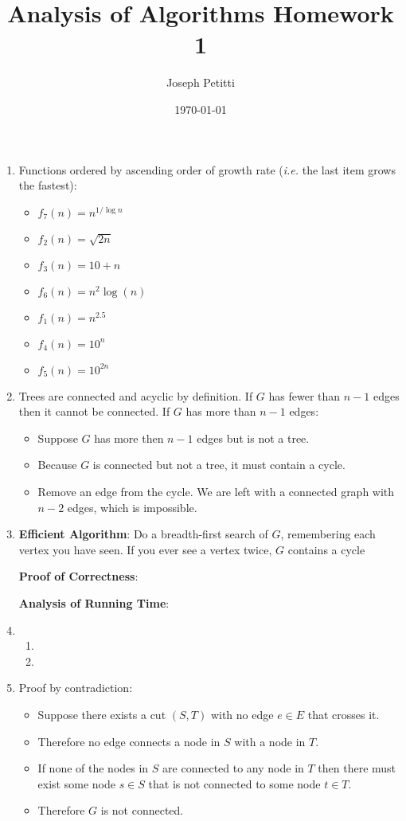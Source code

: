 \documentclass[a4paper, 10pt, american]{article}
\title{Analysis of Algorithms Homework 1}
\author{Joseph Petitti}
\date{\today}
\begin{document}
\maketitle

\begin{enumerate}
	\item Functions ordered by ascending order of growth rate (\textit{i.e.} the
		last item grows the fastest):
		\begin{itemize}
			\item $f_7(n) = n^{1 / \log n}$
			\item $f_2(n) = \sqrt{2n}$
			\item $f_3(n) = 10 + n$
			\item $f_6(n) = n^2 \log (n)$
			\item $f_1(n) = n^{2.5}$
			\item $f_4(n) = 10^{n}$
			\item $f_5(n) = 10^{2n}$
		\end{itemize}

	\item Trees are connected and acyclic by definition. If $G$ has fewer than
		$n - 1$ edges then it cannot be connected. If $G$ has more than $n - 1$
		edges:
		\begin{itemize}
			\item Suppose $G$ has more then $n - 1$ edges but  is not a tree.
			\item Because $G$ is connected but not a tree, it must contain a
				cycle.
			\item Remove an edge from the cycle. We are left with a connected
				graph with $n-2$ edges, which is impossible.
		\end{itemize}

	\item \textbf{Efficient Algorithm}: Do a breadth-first search of $G$,
		remembering each vertex you have seen. If you ever see a vertex twice,
		$G$ contains a cycle

		\textbf{Proof of Correctness}: 

		\textbf{Analysis of Running Time}:

	\item \begin{enumerate}
			\item
			\item
		\end{enumerate}


	\item Proof by contradiction:
		\begin{itemize}
			\item Suppose there exists a cut $(S, T)$ with no edge $e \in E$
				that crosses it.
			\item Therefore no edge connects a node in $S$ with a node in $T$.
			\item If none of the nodes in $S$ are connected to any node in $T$
				then there must exist some node $s \in S$ that is not connected
				to some node $t \in T$.
			\item Therefore $G$ is not connected.
		\end{itemize}
\end{enumerate}
\end{document}
